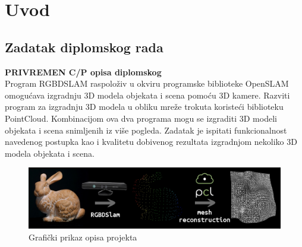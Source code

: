 \newpage

\setcounter{page}{1}
\setcounter{figure}{0}
\section{Uvod}%
\label{sec:Uvod}

\subsection{Zadatak diplomskog rada} %
\label{sub:Zadatak diplomskog rada}
\textbf{PRIVREMEN C/P opisa diplomskog} 
\\
Program RGBDSLAM raspoloživ u okviru programske biblioteke OpenSLAM
omogućava izgradnju 3D modela objekata i scena pomoću 3D kamere.
Razviti program za izgradnju 3D modela u obliku mreže trokuta koristeći
biblioteku PointCloud. Kombinacijom ova dva programa mogu se izgraditi
3D modeli objekata i scena snimljenih iz više pogleda. Zadatak je
ispitati funkcionalnost navedenog postupka kao i kvalitetu dobivenog
rezultata izgradnjom nekoliko 3D modela objekata i scena.

\begin{figure}[h]
\centering
\includegraphics[scale=0.35]{figures/project-description.jpeg}
\caption{Grafički prikaz opisa projekta}
\label{fig:project-description}
\end{figure}

